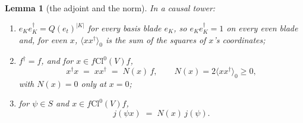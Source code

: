 \documentclass[11pt]{article}
\newtheorem{lemma}[theorem]{Lemma}
\theoremstyle{definition}
\newcommand{\Cl}{\mathrm{Cl}}
\newcommand{\ip}[1]{\langle #1 \rangle}
\begin{document}
\begin{lemma}[the adjoint and the norm]\label{lem:norm}
In a causal tower:
\begin{enumerate}
\item[(i)] $e_{K}e_{K}^{\dagger} = Q(e_{t})^{|K|}$ for every basis blade $e_{K}$, so $e_{K}e_{K}^{\dagger} = 1$ on every even blade and, for even $x$, $\ip{xx^{\dagger}}_{0}$ is the sum of the squares of $x$'s coordinates;
\item[(ii)] $f^{\dagger} = f$, and for $x \in f\Cl^{0}(V)f$,
\[
x^{\dagger}x \;=\; xx^{\dagger} \;=\; N(x)\,f, \qquad N(x) = 2\ip{xx^{\dagger}}_{0} \geq 0,
\]
with $N(x) = 0$ only at $x = 0$;
\item[(iii)] for $\psi \in S$ and $x \in f\Cl^{0}(V)f$,
\[
j(\psi x) \;=\; N(x)\, j(\psi).
\]
\end{enumerate}
\end{lemma}
\end{document}

